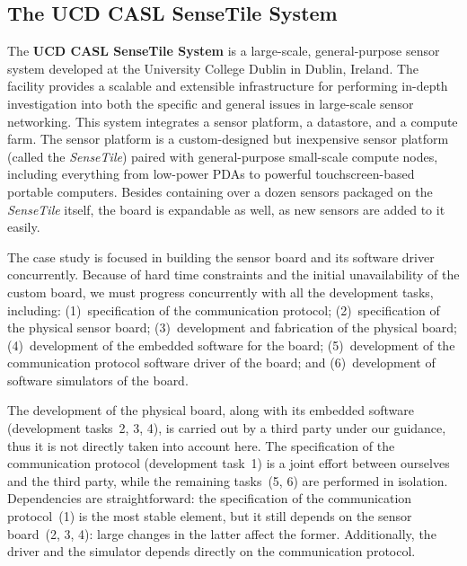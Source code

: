 \documentclass[english]{lni}
\newcommand{\ST}{\emph{SenseTile}\xspace}
\begin{document}
\subsection{The UCD CASL SenseTile System}
\label{sec:ucd-casl-sensetile}

The \textbf{UCD CASL SenseTile System} is a large-scale, general-purpose sensor system developed at the University College Dublin in Dublin, Ireland.  
The facility provides a scalable and extensible infrastructure for performing in-depth investigation into both the specific and general issues in large-scale sensor networking. 
This system integrates a sensor platform, a datastore, and a compute farm.  
The sensor platform is a custom-designed but inexpensive sensor platform (called the \ST) paired with general-purpose small-scale compute nodes, including everything from low-power PDAs to powerful touchscreen-based portable computers.  
Besides containing over a dozen sensors packaged on the \ST itself, the board is expandable as well, as new sensors are added to it easily.

The case study is focused in building the sensor board and its software driver concurrently.  
Because of hard time constraints and the initial unavailability of the custom board, we must progress concurrently with all the development tasks, including: (1)~specification of the communication protocol; (2)~specification of the physical sensor board; (3)~development and fabrication of the physical board; (4)~development of the embedded software for the board; (5)~development of the communication protocol software driver of the board; and (6)~development of software simulators of the board.

The development of the physical board, along with its embedded software (development tasks~2, 3, 4), is carried out by a third party under our guidance, thus it is not directly taken into account here. 
The specification of the communication protocol (development task~1) is a joint effort between ourselves and the third party, while the remaining tasks~(5, 6) are performed in isolation.  
Dependencies are straightforward: the specification of the communication protocol~(1) is the most stable element, but it still depends on the sensor board~(2, 3, 4): large changes in the latter affect the former.
Additionally, the driver and the simulator depends directly on the communication protocol.
\end{document}

